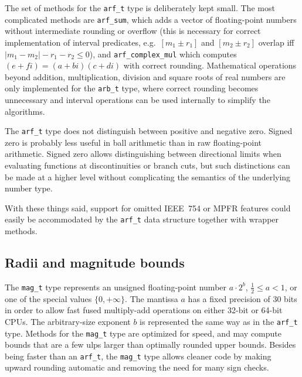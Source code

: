 \documentclass[10pt,journal,compsoc,cspaper]{IEEEtran}
\begin{document}
The set of methods
for the \texttt{arf\_t} type is deliberately kept small.
The most complicated methods are \texttt{arf\_sum}, which adds
a vector of floating-point numbers without intermediate rounding or overflow
(this is necessary for correct implementation of
interval predicates, e.g.\ $[m_1 \pm r_1]$ and $[m_2 \pm r_2]$
overlap iff $|m_1 - m_2| - r_1 - r_2 \le 0$), 
and \texttt{arf\_complex\_mul} which computes
$(e+fi) = (a+bi)(c+di)$ with correct rounding.
Mathematical operations beyond addition,
multiplication, division and square roots of real numbers are
only implemented for the \texttt{arb\_t} type,
where correct rounding becomes unnecessary and
interval operations can be used internally to simplify the algorithms.

The \texttt{arf\_t} type
does not distinguish between positive and negative zero.
Signed zero is probably less useful in ball arithmetic
than in raw floating-point arithmetic.
Signed zero allows distinguishing between directional limits
when evaluating functions at discontinuities or branch cuts,
but such distinctions can be made
at a higher level without complicating the semantics of
the underlying number type.

With these things said, support for omitted IEEE~754 or MPFR features
could easily be accommodated
by the \texttt{arf\_t} data structure together with
wrapper methods.

\subsection{Radii and magnitude bounds}

The \texttt{mag\_t} type represents an
unsigned floating-point number $a \cdot 2^b$, $\tfrac{1}{2} \le a < 1$,
or one of the special values $\{0, +\infty\}$.
The mantissa $a$ has a fixed precision of 30 bits in order to
allow fast fused multiply-add operations on either 32-bit or 64-bit CPUs.
The arbitrary-size exponent $b$ is represented the same
way as in the \texttt{arf\_t} type.
Methods for the \texttt{mag\_t} type are optimized for speed, and may
compute bounds that are a few ulps larger
than optimally rounded upper bounds.
Besides being faster than an \texttt{arf\_t},
the \texttt{mag\_t} type allows cleaner code
by making upward rounding automatic
and removing the need for many sign checks.
\end{document}
